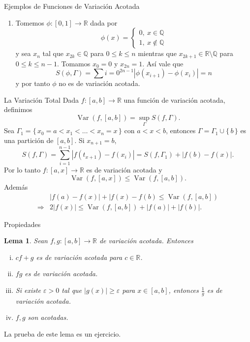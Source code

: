 \documentclass[utf8]{beamer}
\theoremstyle{plain}
\newtheorem{Lem}{Lema}                 %
\theoremstyle{definition}
\theoremstyle{remark}
\numberwithin{equation}{section}
\newcommand{\eps}{\varepsilon}          %
\newcommand{\Ga}{\Gamma}                %
\newcommand{\bQ}{\mathbb{Q}}    %
\newcommand{\bR}{\mathbb{R}}    %
\newcommand{\set}[1]{\{\,#1\,\}}    %
\renewcommand{\geq}{\geqslant}          %
\renewcommand{\leq}{\leqslant}          %
\newcommand{\less}{\setminus}           %
\newcommand{\To}{\Rightarrow}
\renewcommand{\.}{\Cdot}                %
\DeclareMathOperator{\Var}{Var}     %
\begin{document}
\begin{frame}{Ejemplos de Funciones de Variación Acotada}
  
  \begin{enumerate}
  \setcounter{enumi}{\value{saveenumi}}    
\item Tomemos $\phi:[0,1]\to\bR$ dada por 
$$\phi(x)=\begin{cases}
  0,\ x\in\bQ\\
  1,\ x\not\in\bQ
\end{cases}$$
y sea $x_n$ tal que $x_{2k}\in\bQ$ para $0\leq k\leq n$ mientras que $x_{2k+1}\in\bR\less\bQ$ para $0\leq k\leq n-1$. Tomamos $x_0=0$ y $x_{2n}=1$. Así vale que 
$$S(\phi,\Ga)=\sum{i=0}^{2n-1}|\phi(x_{i+1})-\phi(x_i)|=n$$
y por tanto $\phi$ \alert{no es de variación acotada}.
  \end{enumerate}
\end{frame}

\begin{frame}{La Variación Total}
  Dada $f:[a,b]\to\bR$ una función de variación acotada, definimos 
  $$\Var(f,[a,b])=\sup_{\Ga}S(f,\Ga).$$
  Sea $\Ga_1=\set{x_0=a<x_1<\dots<x_n=x}$ con $a<x<b$, entonces $\Ga=\Ga_1\cup\set{b}$ es una partición de $[a,b]$. Si $x_{n+1}=b$, 
  $$S(f,\Ga)=\sum_{i=1}^{n-1}|f(t_{x+1})-f(x_i)|=S(f,\Ga_1)+|f(b)-f(x)|.$$
  Por lo tanto $f:[a,x]\to\bR$ es de variación acotada y 
  $$\Var(f,[a,x])\leq\Var(f,[a,b]).$$
  Además
  \begin{align*}
    &|f(a)-f(x)|+|f(x)-f(b)\leq\Var(f,[a,b])\\
    \To &2|f(x)|\leq \Var(f,[a,b])+|f(a)|+|f(b)|.
  \end{align*}
\end{frame}
  
\begin{frame}{Propiedades}
  \begin{Lem}\label{lem:propsVA}
    Sean $f,g:[a,b]\to\bR$ de variación acotada. Entonces 
    \begin{enumerate}[(i)]
      \item $cf+g$ es de variación acotada para $c\in\bR$.
      \item $fg$ es de variación acotada.
      \item Si existe $\eps>0 $ tal que $|g(x)|\geq\eps$ para $x\in[a,b]$, entonces $\frac{1}{g}$ es de variación acotada.
      \item $f,g$ son acotadas.
    \end{enumerate}
  \end{Lem}
  La prueba de este lema es un \alert{ejercicio}.
\end{frame}
\end{document}
